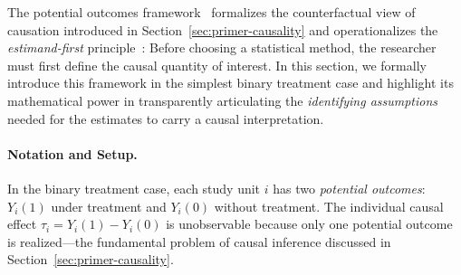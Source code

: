 The potential outcomes framework~\cite{neyman1923application, rubin1974estimating} formalizes the counterfactual view of causation introduced in Section~\ref{sec:primer-causality} and operationalizes the \emph{estimand-first} principle~\cite{lundberg2021estimand}: Before choosing a statistical method, the researcher must first define the causal quantity of interest.
In this section, we formally introduce this framework in the simplest binary treatment case and highlight its mathematical power in transparently articulating the \emph{identifying assumptions} needed for the estimates to carry a causal interpretation.

\paragraph{Notation and Setup.}
In the binary treatment case, each study unit $i$ has two \emph{potential outcomes}: $Y_i(1)$ under treatment and $Y_i(0)$ without treatment.
The individual causal effect $\tau_i = Y_i(1) - Y_i(0)$ is unobservable because only one potential outcome is realized---the fundamental problem of causal inference discussed in Section~\ref{sec:primer-causality}.

